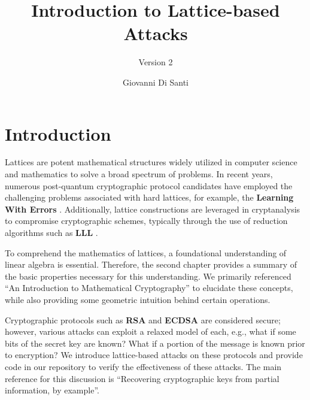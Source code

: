 \documentclass[a4paper,12pt]{report}
\title{Introduction to Lattice-based Attacks}
\subtitle{Version 2}
\author{Giovanni Di Santi}
\date{}
\begin{document}
 
\maketitle

\tableofcontents

\chapter{Introduction}

Lattices are potent mathematical structures widely utilized in computer science and mathematics to solve a broad spectrum of problems.
In recent years, numerous post-quantum cryptographic protocol candidates have employed the challenging problems associated with hard lattices,
for example, the \textbf{Learning With Errors} \cite{LWE}.
Additionally, lattice constructions are leveraged in cryptanalysis to compromise cryptographic schemes, typically through the use of
reduction algorithms such as \textbf{LLL} \cite{LLL}.

To comprehend the mathematics of lattices, a foundational understanding of linear algebra is essential. Therefore, the second chapter provides a summary of the
basic properties necessary for this understanding. We primarily referenced ``An Introduction to Mathematical Cryptography''\cite{mathcrypto14} to
elucidate these concepts, while also providing some geometric intuition behind certain operations.

Cryptographic protocols such as \textbf{RSA} and \textbf{ECDSA} are considered secure; however, various attacks can exploit a
relaxed model of each, e.g., what if some bits of the secret key are known? What if a portion of the message is known prior to encryption?
We introduce lattice-based attacks on these protocols and provide code in our repository \cite{repo} to verify the effectiveness of these attacks. The main reference for this discussion is
``Recovering cryptographic keys from partial information, by example''\cite{cryptoeprint:2020:1506}.
\end{document}
